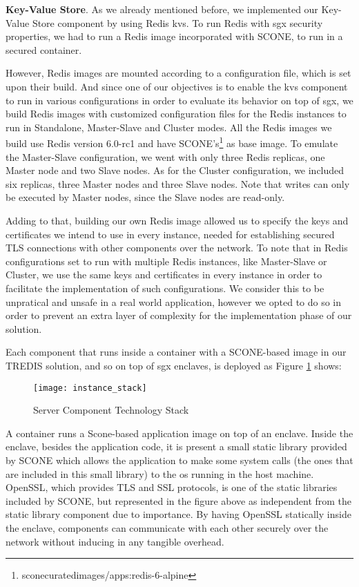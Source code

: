 \vspace{3mm}
\textbf{Key-Value Store}. As we already mentioned before, we implemented our Key-Value Store component by using Redis \gls{kvs}. To run Redis with \gls{sgx} security properties, we had to run a Redis image incorporated with SCONE, to run in a secured container. 

However, Redis images are mounted according to a configuration file, which is set upon their build. 
And since one of our objectives is to enable the \gls{kvs} component to run in various configurations in order to evaluate its behavior on top of \gls{sgx}, we build Redis images with customized configuration files for the Redis instances to run in Standalone, Master-Slave and Cluster modes. All the Redis images we build use Redis version 6.0-rc1 and have SCONE's\footnote{sconecuratedimages/apps:redis-6-alpine} as base image. To emulate the Master-Slave configuration, we went with only three Redis replicas, one Master node and two Slave nodes. As for the Cluster configuration, we included six replicas, three Master nodes and three Slave nodes. Note that writes can only be executed by Master nodes, since the Slave nodes are read-only.

Adding to that, building our own Redis image allowed us to specify the keys and certificates we intend to use in every instance, needed for establishing secured TLS connections with other components over the network. To note that in Redis configurations set to run with multiple Redis instances, like Master-Slave or Cluster, we use the same keys and certificates in every instance in order to facilitate the implementation of such configurations. We consider this to be unpratical and unsafe in a real world application, however we opted to do so in order to prevent an extra layer of complexity for the implementation phase of our solution.


\vspace{3mm}
Each component that runs inside a container with a SCONE-based image in our TREDIS solution, and so on top of \gls{sgx} enclaves, is deployed as Figure \ref{fig:instanceStack} shows:
\begin{figure}[htbp]
	\centering
	{\texttt{[image: instance\_stack]}}
	\caption{Server Component Technology Stack}
	\label{fig:instanceStack}
\end{figure}

A container runs a Scone-based application image on top of an enclave. Inside the enclave, besides the application code, it is present a small static library provided by SCONE which allows the application to make some system calls (the ones that are included in this small library) to the \gls{os} running in the host machine. OpenSSL, which provides TLS and SSL protocols, is one of the static libraries included by SCONE, but represented in the figure above as independent from the static library component due to importance. By having OpenSSL statically inside the enclave, components can communicate with each other securely over the network without inducing in any tangible overhead. 



